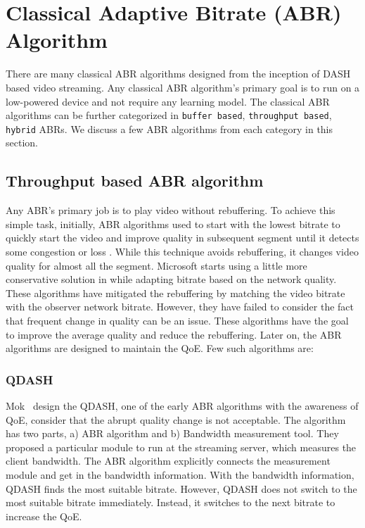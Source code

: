 \section{Classical Adaptive Bitrate (ABR) Algorithm}
There are many classical ABR algorithms designed from the inception of DASH based video streaming. Any classical ABR algorithm's primary goal is to run on a low-powered device and not require any learning model. The classical ABR algorithms can be further categorized in {\tt buffer based}, {\tt throughput based}, {\tt hybrid} ABRs. We discuss a few ABR algorithms from each category in this section.

\subsection{Throughput based ABR algorithm}
Any ABR's primary job is to play video without rebuffering. To achieve this simple task, initially, ABR algorithms used to start with the lowest bitrate to quickly start the video and improve quality in subsequent segment until it detects some congestion or loss \cite{5677508,10.1145/1943552.1943575}. While this technique avoids rebuffering, it changes video quality for almost all the segment. Microsoft starts using a little more conservative solution in \cite{10.1145/1943552.1943574} while adapting bitrate based on the network quality. These algorithms have mitigated the rebuffering by matching the video bitrate with the observer network bitrate. However, they have failed to consider the fact that frequent change in quality can be an issue. These algorithms have the goal to improve the average quality and reduce the rebuffering. Later on, the ABR algorithms are designed to maintain the QoE. Few such algorithms are:

\subsubsection{QDASH}
Mok \etal\ design the QDASH\cite{10.1145/2155555.2155558}, one of the early ABR algorithms with the awareness of QoE, consider that the abrupt quality change is not acceptable. The algorithm has two parts, a) ABR algorithm and b) Bandwidth measurement tool. They proposed a particular module to run at the streaming server, which measures the client bandwidth. The ABR algorithm explicitly connects the measurement module and get in the bandwidth information. With the bandwidth information, QDASH finds the most suitable bitrate. However, QDASH does not switch to the most suitable bitrate immediately. Instead, it switches to the next bitrate to increase the QoE.

